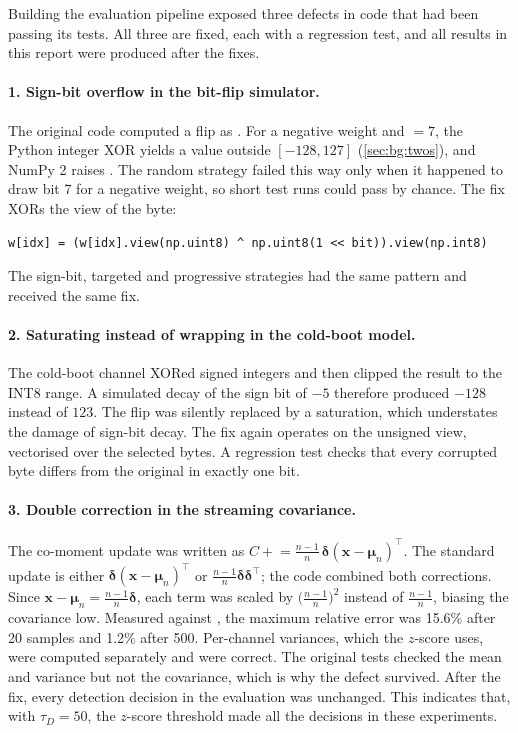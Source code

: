Building the evaluation pipeline exposed three defects in code that had been passing its tests.
All three are fixed, each with a regression test, and all results in this report were produced
after the fixes.

\paragraph{1. Sign-bit overflow in the bit-flip simulator.} The original code computed a flip as
. For a negative weight and  $=7$, the
Python integer XOR yields a value outside $[-128,127]$ (\cref{sec:bg:twos}), and NumPy 2 raises
. The random strategy failed this way only when it happened to draw bit 7
for a negative weight, so short test runs could pass by chance. The fix XORs the
 view of the byte:

\begin{lstlisting}
w[idx] = (w[idx].view(np.uint8) ^ np.uint8(1 << bit)).view(np.int8)
\end{lstlisting}

The sign-bit, targeted and progressive strategies had the same pattern and received the same
fix.

\paragraph{2. Saturating instead of wrapping in the cold-boot model.} The cold-boot channel XORed
signed integers and then clipped the result to the INT8 range. A simulated decay of the sign bit
of $-5$ therefore produced $-128$ instead of $123$. The flip was silently replaced by a
saturation, which understates the damage of sign-bit decay. The fix again operates on the
unsigned view, vectorised over the selected bytes. A regression test checks that every corrupted
byte differs from the original in exactly one bit.

\paragraph{3. Double correction in the streaming covariance.} The co-moment update was written as
$C \mathrel{+}= \frac{n-1}{n}\,\boldsymbol\delta(\mathbf{x}-\boldsymbol\mu_n)^\top$. The
standard update is either $\boldsymbol\delta(\mathbf{x}-\boldsymbol\mu_n)^\top$ or
$\frac{n-1}{n}\boldsymbol\delta\boldsymbol\delta^\top$; the code combined both corrections.
Since $\mathbf{x}-\boldsymbol\mu_n = \frac{n-1}{n}\boldsymbol\delta$, each term was scaled by
$\big(\frac{n-1}{n}\big)^2$ instead of $\frac{n-1}{n}$, biasing the covariance low. Measured
against , the maximum relative error was 15.6\% after 20 samples and 1.2\% after
500. Per-channel variances, which the $z$-score uses, were computed separately and were correct.
The original tests checked the mean and variance but not the covariance, which is why the defect
survived. After the fix, every detection decision in the evaluation was unchanged. This indicates
that, with $\tau_D=50$, the $z$-score threshold made all the decisions in these experiments.

